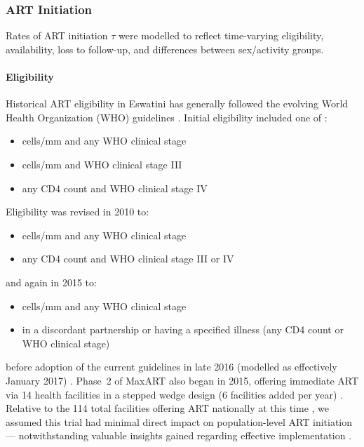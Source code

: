\subsubsection{ART Initiation}\label{mod.par.cascade.tx}
Rates of ART initiation $\tau$ were modelled to reflect
time-varying eligibility, availability, loss to follow-up,
and differences between sex/activity groups.
\paragraph{Eligibility}
Historical ART eligibility in Eswatini has generally followed
the evolving World Health Organization (WHO) guidelines
\cite{WHO2003art,WHO2007art,WHO2013art,WHO2016art}.
Initial eligibility included one of \cite{EswMOH2006gui}:
\begin{itemize}
  \item {} cells/mm and any WHO clinical stage
  \item {} cells/mm and WHO clinical stage III
  \item any CD4 count and WHO clinical stage IV
\end{itemize}
Eligibility was revised in 2010 \cite{EswMOH2010gui} to:
\begin{itemize}
  \item {} cells/mm and any WHO clinical stage
  \item any CD4 count and WHO clinical stage III or IV
\end{itemize}
and again in 2015 \cite{EswMOH2015gui} to:
\begin{itemize}
  \item {} cells/mm and any WHO clinical stage
  \item in a discordant partnership or having a specified illness (any CD4 count or WHO clinical stage)
\end{itemize}
before adoption of the current  guidelines
in late 2016 (modelled as effectively January 2017) \cite{MaxART2,EswMOH2018gui}.
Phase~2 of MaxART also began in 2015, offering immediate ART
via 14 health facilities in a stepped wedge design (6 facilities added per year) \cite{MaxART2}.
Relative to the 114 total facilities offering ART nationally at this time \cite{NERCHA2014nsf},
we assumed this trial had minimal direct impact on population-level ART initiation
--- notwithstanding valuable insights gained regarding effective implementation \cite{MaxART2}.
